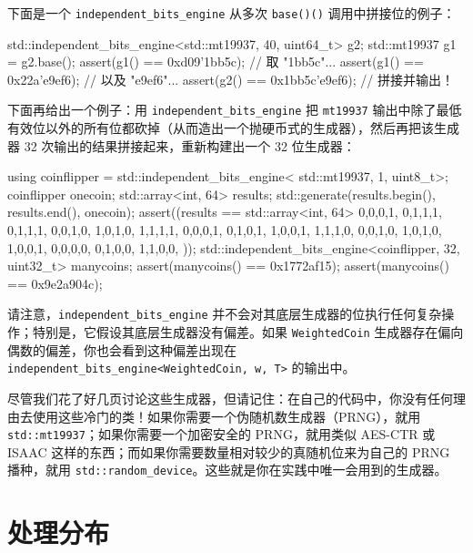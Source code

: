 下面是一个 \texttt{independent\_\allowbreak{}bits\_\allowbreak{}engine} 从多次 \texttt{base(\allowbreak{})\allowbreak{}(\allowbreak{})\allowbreak{}} 调用中拼接位的例子：

\begin{codebox}[cpp]
    std::independent_bits_engine<std::mt19937, 40, uint64_t> g2;
    std::mt19937 g1 = g2.base();
    assert(g1() == 0xd09'1bb5c); // 取 "1bb5c"...
    assert(g1() == 0x22a'e9ef6); // 以及 "e9ef6"...
    assert(g2() == 0x1bb5c'e9ef6); // 拼接并输出！
\end{codebox}

下面再给出一个例子：用 \texttt{independent\_\allowbreak{}bits\_\allowbreak{}engine} 把 \texttt{mt19937} 输出中除了最低有效位以外的所有位都砍掉（从而造出一个抛硬币式的生成器），然后再把该生成器 32 次输出的结果拼接起来，重新构建出一个 32 位生成器：

\begin{codebox}[cpp]
    using coinflipper = std::independent_bits_engine<
      std::mt19937, 1, uint8_t>;
    coinflipper onecoin;
    std::array<int, 64> results;
    std::generate(results.begin(), results.end(), onecoin);
    assert((results == std::array<int, 64>{{
      0,0,0,1, 0,1,1,1, 0,1,1,1, 0,0,1,0,
      1,0,1,0, 1,1,1,1, 0,0,0,1, 0,1,0,1,
      1,0,0,1, 1,1,1,0, 0,0,1,0, 1,0,1,0,
      1,0,0,1, 0,0,0,0, 0,1,0,0, 1,1,0,0,
    }}));
    std::independent_bits_engine<coinflipper, 32, uint32_t> manycoins;
    assert(manycoins() == 0x1772af15);
    assert(manycoins() == 0x9e2a904c);
\end{codebox}

请注意，\texttt{independent\_\allowbreak{}bits\_\allowbreak{}engine} 并不会对其底层生成器的位执行任何复杂操作；特别是，它假设其底层生成器没有偏差。如果 \texttt{Weighted\allowbreak{}Coin} 生成器存在偏向偶数的偏差，你也会看到这种偏差出现在 \texttt{independent\_\allowbreak{}bits\_\allowbreak{}engine<\allowbreak{}Weighted\allowbreak{}Coin,\allowbreak{} w,\allowbreak{} T>\allowbreak{}} 的输出中。

尽管我们花了好几页讨论这些生成器，但请记住：在自己的代码中，你没有任何理由去使用这些冷门的类！如果你需要一个伪随机数生成器（PRNG），就用 \texttt{std::\allowbreak{}mt19937}；如果你需要一个加密安全的 PRNG，就用类似 AES-CTR 或 ISAAC 这样的东西；而如果你需要数量相对较少的真随机位来为自己的 PRNG 播种，就用 \texttt{std::\allowbreak{}random\_\allowbreak{}device}。这些就是你在实践中唯一会用到的生成器。

\section{处理分布}

